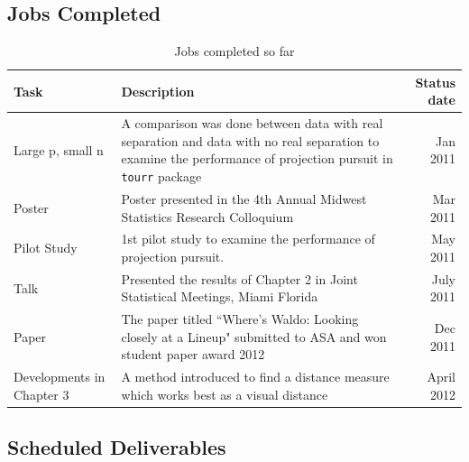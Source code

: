 \subsection{Jobs Completed}

\begin{table}[hbtp]
\caption{Jobs completed so far}
\centering 
\begin{tabular}{|l|p{10cm}|r|} 
\hline
Task &  Description & Status date\\ %
\hline
Large p, small n & A comparison was done between data with real separation and data with no real separation to examine the performance of projection pursuit in \texttt{tourr} package \vspace{.1in} & Jan 2011 \\
Poster & Poster presented in the 4th Annual Midwest Statistics Research Colloquium\vspace{.1in} & Mar 2011 \\ 
Pilot Study & 1st pilot study to examine the performance of projection pursuit.  \vspace{.1in} & May 2011\\ 
Talk & Presented the results of Chapter 2 in Joint Statistical Meetings, Miami Florida \vspace{.1in} & July 2011 \\
Paper & The paper titled ``Where's Waldo: Looking closely at a Lineup" submitted to ASA and won student paper award 2012 \vspace{.1in} & Dec 2011 \\

Developments in Chapter 3 & A method introduced to find a distance measure which works best as a visual distance \vspace{.1in} & April 2012\\
\hline
\end{tabular}
\label{tbl:cjob}
\end{table}	

\subsection{Scheduled Deliverables}


